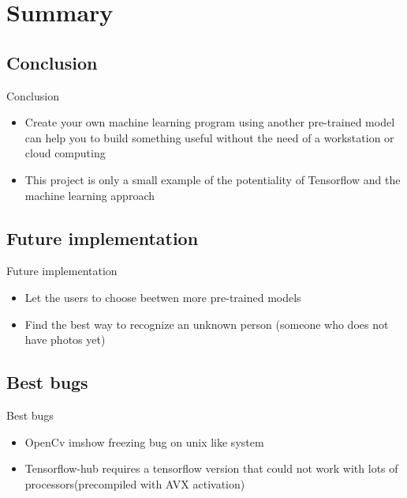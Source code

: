 \documentclass{beamer}
\begin{document}
\section{Summary}

\subsection{Conclusion}
\begin{frame}{Conclusion}
\begin{itemize}
\setlength\itemsep{1em}
[triangle]
\item Create your own machine learning program using another pre-trained model can help you to build something useful without the need of a workstation or cloud computing
\item This project is only a small example of the potentiality of Tensorflow and the machine learning approach
\end{itemize}
\end{frame}

\subsection{Future implementation}

\begin{frame}{Future implementation}
\begin{itemize}
\setlength\itemsep{1em}
[triangle]
\item Let the users to choose beetwen more pre-trained models
\item Find the best way to recognize an unknown person (someone who does not have photos yet)
\end{itemize}
\end{frame}

\subsection{Best bugs}

\begin{frame}{Best bugs}
\begin{itemize}
\setlength\itemsep{1em}
[triangle]
\item OpenCv imshow freezing bug on unix like system
\item Tensorflow-hub requires a tensorflow version that could not work with lots of processors(precompiled with AVX activation)
\end{itemize}
\end{frame}
\end{document}
